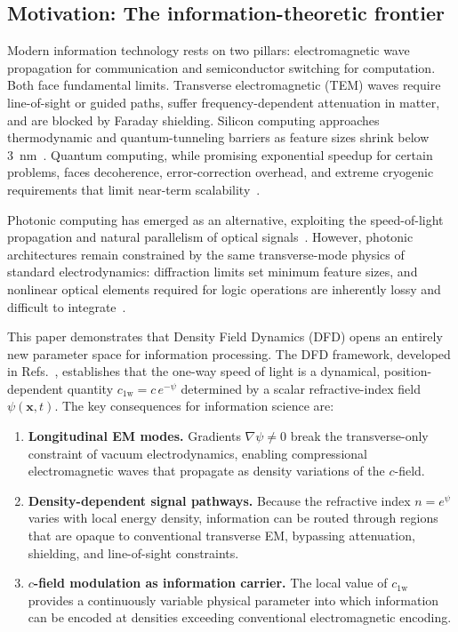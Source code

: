 \documentclass[aps,prd,twocolumn,superscriptaddress,nofootinbib,floatfix]{revtex4-2}
\newcommand{\psifield}{\psi}
\newcommand{\cfield}{c_{\text{1w}}}
\newcommand{\cvac}{c}
\newcommand{\xvec}{\mathbf{x}}
\begin{document}
\subsection{Motivation: The information-theoretic frontier}

Modern information technology rests on two pillars: electromagnetic
wave propagation for communication and semiconductor switching for
computation. Both face fundamental limits. Transverse electromagnetic
(TEM) waves require line-of-sight or guided paths, suffer frequency-dependent
attenuation in matter, and are blocked by Faraday shielding.
Silicon computing approaches thermodynamic and quantum-tunneling
barriers as feature sizes shrink below 3~nm~\cite{IRDS2024}.
Quantum computing, while promising exponential speedup for certain
problems, faces decoherence, error-correction overhead, and extreme
cryogenic requirements that limit near-term scalability~\cite{Preskill2018}.

Photonic computing has emerged as an alternative, exploiting the
speed-of-light propagation and natural parallelism of optical
signals~\cite{Shen2017,Feldmann2021}. However, photonic architectures
remain constrained by the same transverse-mode physics of standard
electrodynamics: diffraction limits set minimum feature sizes, and
nonlinear optical elements required for logic operations are
inherently lossy and difficult to integrate~\cite{Miller2017}.

This paper demonstrates that Density Field Dynamics (DFD) opens an
entirely new parameter space for information processing. The DFD
framework, developed in Refs.~\cite{Alcock2025DFD,Alcock2025Strong,
Alcock2025EMCoupling}, establishes that the one-way speed of light
is a dynamical, position-dependent quantity $\cfield = \cvac\,
e^{-\psifield}$ determined by a scalar refractive-index field
$\psifield(\xvec,t)$.
The key consequences for information science are:

\begin{enumerate}
\item \textbf{Longitudinal EM modes.} Gradients $\nabla\psifield
\neq 0$ break the transverse-only constraint of vacuum
electrodynamics, enabling compressional electromagnetic waves
that propagate as density variations of the $c$-field.

\item \textbf{Density-dependent signal pathways.} Because the
refractive index $n = e^{\psifield}$ varies with local energy
density, information can be routed through regions that are opaque
to conventional transverse EM, bypassing attenuation, shielding,
and line-of-sight constraints.

\item \textbf{$c$-field modulation as information carrier.} The
local value of $\cfield$ provides a continuously variable
physical parameter into which information can be encoded at
densities exceeding conventional electromagnetic encoding.
\end{enumerate}
\end{document}
